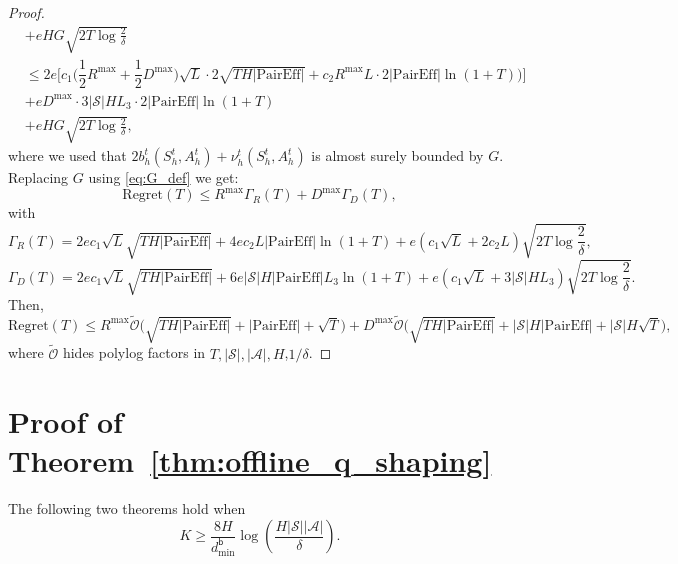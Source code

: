 \documentclass[twoside]{article}
\begin{document}
\begin{proof}
\begin{align*}
    &+eHG\sqrt{2T\log \frac{2}{\delta}}\\
    & \leq 2e\Big[c_1\Big(\dfrac12R^{\max}+\dfrac12 D^{\max}\Big)\sqrt{L} \cdot 2\sqrt{TH|\mathrm{PairEff}|}+ c_2R^{\max}L\cdot 2 |\mathrm{PairEff}|\ln(1+T)\Big)\Big] \\
&+ eD^{\max}\cdot3|\mathcal{S}|HL_{3}\cdot2|\mathrm{PairEff}|\ln(1+T)\\
&+eHG\sqrt{2T\log \frac{2}{\delta}},
\end{align*}
%
where we used that $2b_h^{t}(S_h^t,A_h^t)+ \nu_h^{t}(S_h^t,A_h^t)$ is almost surely bounded by $G$. Replacing $G$ using \ref{eq:G_def} we get: 
\[
\mathrm{Regret}(T)\le R^{\max}\Gamma_R(T)+D^{\max}\Gamma_D(T),
\]
with
\[
\Gamma_R(T)=2ec_1\sqrt{L}\sqrt{TH|\mathrm{PairEff}|}+4ec_2L|\mathrm{PairEff}|\ln(1+T)+e\left(c_1\sqrt{L}+2c_2L\right)\sqrt{2T\log\dfrac{2}{\delta}},
\]
\[
\Gamma_D(T)=2ec_1\sqrt{L}\sqrt{TH|\mathrm{PairEff}|}+6e|\mathcal{S}|H|\mathrm{PairEff}|L_3\ln(1+T)+e\left(c_1\sqrt{L}+3|\mathcal{S}|HL_3\right)\sqrt{2T\log\dfrac{2}{\delta}}.
\]
Then,
\[
\mathrm{Regret}(T)
\le
R^{\max}\tilde{\mathcal O}\Big(\sqrt{TH|\mathrm{PairEff}|}+|\mathrm{PairEff}|+\sqrt{T}\Big)
+
D^{\max}\tilde{\mathcal O}\Big(\sqrt{TH|\mathrm{PairEff}|}+|\mathcal{S}|H|\mathrm{PairEff}|+|\mathcal{S}|H\sqrt{T}\Big),
\]
where $\tilde{\mathcal O}$ hides polylog factors in $T,|\mathcal{S}|,|\mathcal{A}|,H$,$1/\delta$.
\end{proof}

\section{Proof of Theorem~\ref{thm:offline_q_shaping}}
\label{sec:final_results}

The following two theorems hold when 
\[
     K\ge \frac{8H}{d^{\mathsf{b}}_{\min}}\log\left(\frac{H|\mathcal{S}||\mathcal{A}|}{\delta}\right).
\]
\end{document}
